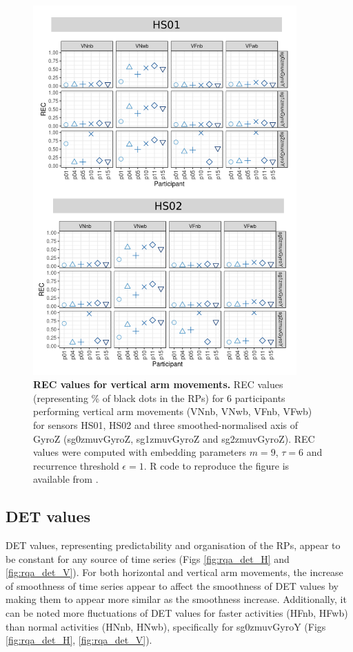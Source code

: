 \begin{figure}[!h]
\centering
\includegraphics[width=0.9\textwidth]{rqa_rec_V_w500}
    \caption{
	{\bf REC values for vertical arm movements.}	
	REC values (representing \% of black dots in the RPs) for 
	6 participants performing vertical arm movements 
	(VNnb, VNwb, VFnb, VFwb)
	for sensors HS01, HS02 and three smoothed-normalised axis 
	of GyroZ (sg0zmuvGyroZ, sg1zmuvGyroZ and sg2zmuvGyroZ).
	REC values were computed with 
	embedding parameters $m=9$, $\tau=6$ and recurrence threshold
	$\epsilon=1$.
	R code to reproduce the figure is available from \cite{hwum2018}.
        }
    \label{fig:rqa_rec_V}
\end{figure}


\subsection{DET values}
DET values, representing predictability and organisation of the RPs, appear
to be constant for any source of time series 
(Figs \ref{fig:rqa_det_H} and \ref{fig:rqa_det_V}).
For both horizontal and vertical arm movements, the increase of smoothness 
of time series appear to affect the smoothness of DET values by making them 
to appear more similar as the smoothness increase.
Additionally, it can be noted more fluctuations of DET values 
for faster activities (HFnb, HFwb) 
than normal activities (HNnb, HNwb), specifically for  sg0zmuvGyroY 
(Figs \ref{fig:rqa_det_H}, \ref{fig:rqa_det_V}).


